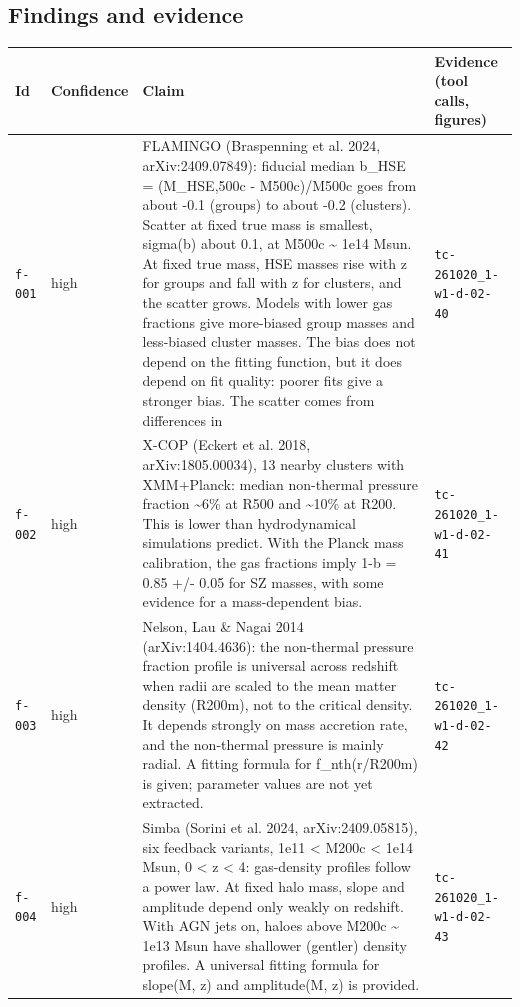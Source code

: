 \documentclass[11pt,a4paper]{article}
\begin{document}
\subsection{Findings and evidence}
\begin{longtable}{@{}p{}p{}p{}p{}@{}}
\toprule Id & Confidence & Claim & Evidence (tool calls, figures) \\ \midrule \endhead
\texttt{f-001} & high & FLAMINGO (Braspenning et al. 2024, arXiv:2409.07849): fiducial median b\_HSE = (M\_HSE,500c - M500c)/M500c goes from about -0.1 (groups) to about -0.2 (clusters). Scatter at fixed true mass is smallest, sigma(b) about 0.1, at M500c \textasciitilde{} 1e14 Msun. At fixed true mass, HSE masses rise with z for groups and fall with z for clusters, and the scatter grows. Models with lower gas fractions give more-biased group masses and less-biased cluster masses. The bias does not depend on the fitting function, but it does depend on fit quality: poorer fits give a stronger bias. The scatter comes from differences in & \texttt{tc-261020\_\allowbreak{}1-w1-d-02-40} \\
\texttt{f-002} & high & X-COP (Eckert et al. 2018, arXiv:1805.00034), 13 nearby clusters with XMM+Planck: median non-thermal pressure fraction \textasciitilde{}6\% at R500 and \textasciitilde{}10\% at R200. This is lower than hydrodynamical simulations predict. With the Planck mass calibration, the gas fractions imply 1-b = 0.85 +/- 0.05 for SZ masses, with some evidence for a mass-dependent bias. & \texttt{tc-261020\_\allowbreak{}1-w1-d-02-41} \\
\texttt{f-003} & high & Nelson, Lau \& Nagai 2014 (arXiv:1404.4636): the non-thermal pressure fraction profile is universal across redshift when radii are scaled to the mean matter density (R200m), not to the critical density. It depends strongly on mass accretion rate, and the non-thermal pressure is mainly radial. A fitting formula for f\_nth(r/R200m) is given; parameter values are not yet extracted. & \texttt{tc-261020\_\allowbreak{}1-w1-d-02-42} \\
\texttt{f-004} & high & Simba (Sorini et al. 2024, arXiv:2409.05815), six feedback variants, 1e11 \textless{} M200c \textless{} 1e14 Msun, 0 \textless{} z \textless{} 4: gas-density profiles follow a power law. At fixed halo mass, slope and amplitude depend only weakly on redshift. With AGN jets on, haloes above M200c \textasciitilde{} 1e13 Msun have shallower (gentler) density profiles. A universal fitting formula for slope(M, z) and amplitude(M, z) is provided. & \texttt{tc-261020\_\allowbreak{}1-w1-d-02-43} \\

\end{longtable}
\end{document}
